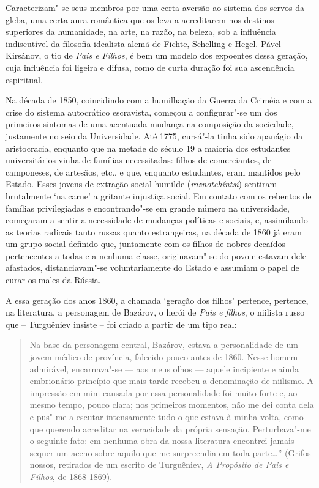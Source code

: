 Caracterizam"-se seus membros por uma certa aversão ao sistema dos servos
da gleba, uma certa aura romântica que os leva a acreditarem nos
destinos superiores da humanidade, na arte, na razão, na beleza, sob a
influência indiscutível da filosofia idealista alemã de Fichte,
Schelling e Hegel. Pável Kirsánov, o tio de \emph{Pais e Filhos}, é bem
um modelo dos expoentes dessa geração, cuja influência foi ligeira e
difusa, como de curta duração foi sua ascendência espiritual.

Na década de 1850, coincidindo com a humilhação da Guerra da Criméia e
com a crise do sistema autocrático escravista, começou a configurar"-se
um dos primeiros sintomas de uma acentuada mudança na composição da
sociedade, justamente no seio da Universidade. Até 1775, cursá"-la tinha
sido apanágio da aristocracia, enquanto que na metade do século 19 a
maioria dos estudantes universitários vinha de famílias necessitadas:
filhos de comerciantes, de camponeses, de artesãos, etc., e que,
enquanto estudantes, eram mantidos pelo Estado. Esses jovens de extração
social humilde (\emph{raznotchíntsi}) sentiram brutalmente `na carne' a
gritante injustiça social. Em contato com os rebentos de famílias
privilegiadas e encontrando"-se em grande número na universidade,
começaram a sentir a necessidade de mudanças políticas e sociais, e,
assimilando as teorias radicais tanto russas quanto estrangeiras, na
década de 1860 já eram um grupo social definido que, juntamente com os
filhos de nobres decaídos pertencentes a todas e a nenhuma classe,
originavam"-se do povo e estavam dele afastados, distanciavam"-se
voluntariamente do Estado e assumiam o papel de curar os males da
Rússia.

A essa geração dos anos 1860, a chamada `geração dos filhos' pertence,
pertence, na literatura, a personagem de Bazárov, o herói de \emph{Pais
e filhos}, o niilista russo que -- Turguêniev insiste -- foi criado a
partir de um tipo real:

\begin{quote}
Na base da personagem central, Bazárov, estava a personalidade de um
jovem médico de província, falecido pouco antes de 1860. Nesse homem
admirável, encarnava"-se --- aos meus olhos --- aquele incipiente e ainda
embrionário princípio que mais tarde recebeu a denominação de niilismo.
A impressão em mim causada por essa personalidade foi muito forte e, ao
mesmo tempo, pouco clara; nos primeiros momentos, não me dei conta dela
e pus"-me a escutar intensamente tudo o que estava à minha volta, como
que querendo acreditar na veracidade da própria sensação. Perturbava"-me
o seguinte fato: em nenhuma obra da nossa literatura encontrei jamais
sequer um aceno sobre aquilo que me surpreendia em toda parte\ldots{}''
(Grifos nossos, retirados de um escrito de Turguêniev, \emph{A Propósito
de Pais e Filhos}, de 1868-1869).
\end{quote}

